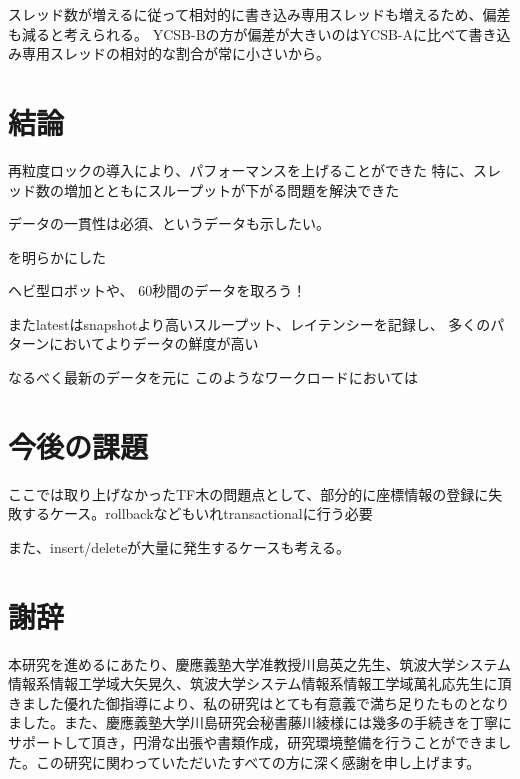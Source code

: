 \documentclass[a4paper]{jreport}	%
\begin{document}
スレッド数が増えるに従って相対的に書き込み専用スレッドも増えるため、偏差も減ると考えられる。
YCSB-Bの方が偏差が大きいのはYCSB-Aに比べて書き込み専用スレッドの相対的な割合が常に小さいから。


\chapter{結論}
再粒度ロックの導入により、パフォーマンスを上げることができた
特に、スレッド数の増加とともにスループットが下がる問題を解決できた

データの一貫性は必須、というデータも示したい。

を明らかにした

ヘビ型ロボットや、
60秒間のデータを取ろう！

またlatestはsnapshotより高いスループット、レイテンシーを記録し、
多くのパターンにおいてよりデータの鮮度が高い

なるべく最新のデータを元に
このようなワークロードにおいては


\chapter{今後の課題}
ここでは取り上げなかったTF木の問題点として、部分的に座標情報の登録に失敗するケース。rollbackなどもいれtransactionalに行う必要

また、insert/deleteが大量に発生するケースも考える。


\chapter*{謝辞}

本研究を進めるにあたり、慶應義塾大学准教授川島英之先生、筑波大学システム情報系情報工学域大矢晃久、筑波大学システム情報系情報工学域萬礼応先生に頂きました優れた御指導により、私の研究はとても有意義で満ち足りたものとなりました。また、慶應義塾大学川島研究会秘書藤川綾様には幾多の手続きを丁寧にサポートして頂き，円滑な出張や書類作成，研究環境整備を行うことができました。この研究に関わっていただいたすべての方に深く感謝を申し上げます。

\newpage
{}
\renewcommand{\bibname}{参考文献}



%
%

	
\end{document}
